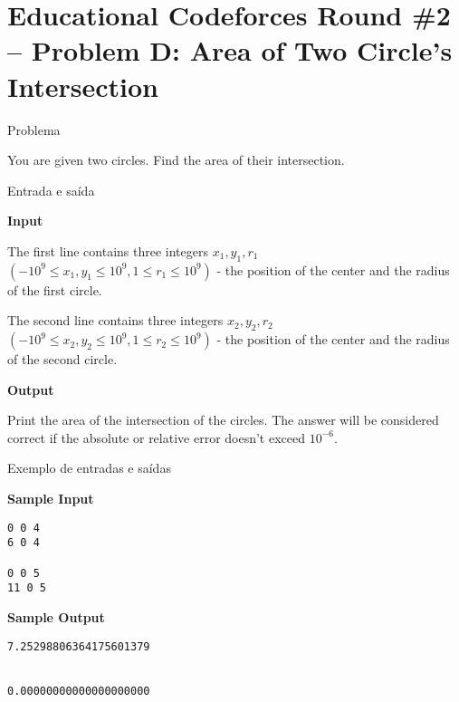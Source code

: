 \section{Educational Codeforces Round \#2 -- Problem D: Area of Two Circle's Intersection}

\begin{frame}[fragile]{Problema}

You are given two circles. Find the area of their intersection.

\end{frame}

\begin{frame}[fragile]{Entrada e saída}

\textbf{Input}

The first line contains three integers $x_1, y_1, r_1$ $(-10^9\leq x_1, y_1\leq 10^9, 1\leq r_1\leq 10^9)$ - the position of the center and the radius of the first circle.

The second line contains three integers $x_2, y_2, r_2$ $(-10^9\leq x_2, y_2\leq 10^9, 1\leq r_2\leq 10^9)$ - the position of the center and the radius of the second circle.

\textbf{Output}

Print the area of the intersection of the circles. The answer will be considered correct if the absolute or relative error doesn't exceed $10^{-6}$.

\end{frame}

\begin{frame}[fragile]{Exemplo de entradas e saídas}

\begin{minipage}[t]{0.5\textwidth}
\textbf{Sample Input}
\begin{verbatim}
0 0 4
6 0 4

0 0 5
11 0 5
\end{verbatim}
\end{minipage}
\begin{minipage}[t]{0.45\textwidth}
\textbf{Sample Output}
\begin{verbatim}
7.25298806364175601379


0.00000000000000000000
\end{verbatim}
\end{minipage}
\end{frame}

